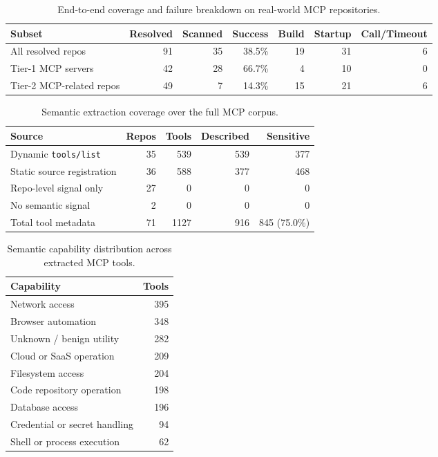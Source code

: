 
\begin{table}[t]
\centering
\caption{End-to-end coverage and failure breakdown on real-world MCP repositories.}
\label{tab:realworld-coverage}
\begin{tabular}{lrrrrrr}
\toprule
Subset & Resolved & Scanned & Success & Build & Startup & Call/Timeout \\
\midrule
All resolved repos & 91 & 35 & 38.5\% & 19 & 31 & 6 \\
Tier-1 MCP servers & 42 & 28 & 66.7\% & 4 & 10 & 0 \\
Tier-2 MCP-related repos & 49 & 7 & 14.3\% & 15 & 21 & 6 \\
\bottomrule
\end{tabular}
\end{table}

\begin{table}[t]
\centering
\caption{Semantic extraction coverage over the full MCP corpus.}
\label{tab:semantic-full-coverage}
\begin{tabular}{lrrrr}
\toprule
Source & Repos & Tools & Described & Sensitive \\
\midrule
Dynamic \texttt{tools/list} & 35 & 539 & 539 & 377 \\
Static source registration & 36 & 588 & 377 & 468 \\
Repo-level signal only & 27 & 0 & 0 & 0 \\
No semantic signal & 2 & 0 & 0 & 0 \\
\midrule
Total tool metadata & 71 & 1127 & 916 & 845 (75.0\%) \\
\bottomrule
\end{tabular}
\end{table}

\begin{table}[t]
\centering
\caption{Semantic capability distribution across extracted MCP tools.}
\label{tab:semantic-capabilities}
\begin{tabular}{lr}
\toprule
Capability & Tools \\
\midrule
Network access & 395 \\
Browser automation & 348 \\
Unknown / benign utility & 282 \\
Cloud or SaaS operation & 209 \\
Filesystem access & 204 \\
Code repository operation & 198 \\
Database access & 196 \\
Credential or secret handling & 94 \\
Shell or process execution & 62 \\
\bottomrule
\end{tabular}
\end{table}

